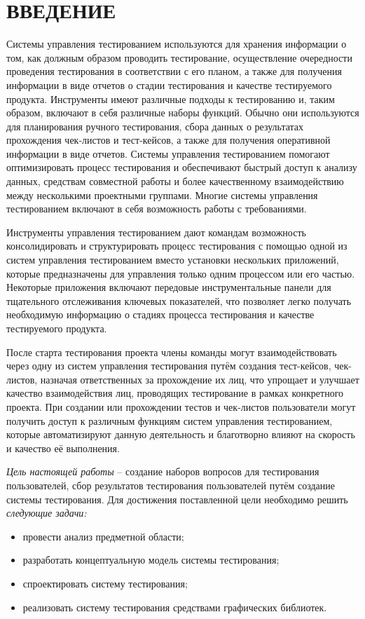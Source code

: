\section*{ВВЕДЕНИЕ}

Системы управления тестированием используются для хранения информации о том, как должным образом проводить тестирование, осуществление очередности проведения тестирования в соответствии с его планом, а также для получения информации в виде отчетов о стадии тестирования и качестве тестируемого продукта. Инструменты имеют различные подходы к тестированию и, таким образом, включают в себя различные наборы функций. Обычно они используются для планирования ручного тестирования, сбора данных о результатах прохождения чек-листов и тест-кейсов, а также для получения оперативной информации в виде отчетов. Системы управления тестированием помогают оптимизировать процесс тестирования и обеспечивают быстрый доступ к анализу данных, средствам совместной работы и более качественному взаимодействию между несколькими проектными группами. Многие системы управления тестированием включают в себя возможность работы с требованиями.

Инструменты управления тестированием дают командам возможность консолидировать и структурировать процесс тестирования с помощью одной из систем управления тестированием вместо установки нескольких приложений, которые предназначены для управления только одним процессом или его частью. Некоторые приложения включают передовые инструментальные панели для тщательного отслеживания ключевых показателей, что позволяет легко получать необходимую информацию о стадиях процесса тестирования и качестве тестируемого продукта.

После старта тестирования проекта члены команды могут взаимодействовать через одну из систем управления тестирования путём создания тест-кейсов, чек-листов, назначая ответственных за прохождение их лиц, что упрощает и улучшает качество взаимодействия лиц, проводящих тестирование в рамках конкретного проекта. При создании или прохождении тестов и чек-листов пользователи могут получить доступ к различным функциям систем управления тестированием, которые автоматизируют данную деятельность и благотворно влияют на скорость и качество её выполнения.

\emph{Цель настоящей работы} – создание наборов вопросов для тестирования пользователей, сбор результатов тестирования пользователей путём создание системы тестирования. Для достижения поставленной цели необходимо решить \emph{следующие задачи:}
\begin{itemize}
\item провести анализ предметной области;
\item разработать концептуальную модель системы тестирования;
\item спроектировать систему тестирования;
\item реализовать систему тестирования средствами графических библиотек.
\end{itemize}

